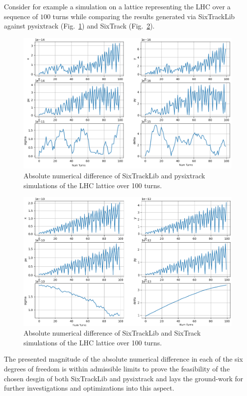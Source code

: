 \documentclass[a4paper,
              ]{jacow}
\begin{document}
Consider for example a simulation on a lattice representing the LHC over a sequence of $100$ turns while comparing the results generated via SixTrackLib against pysixtrack (Fig.~\ref{fig:cmp_sixtracklib_pysixtrack}) and SixTrack (Fig.~\ref{fig:cmp_sixtracklib_sixtrack}). 
\begin{figure}[htb]
 \centering
 \includegraphics[width=\columnwidth]{cmp_sixtracklib_pysixtrack.png}
 \caption{Absolute numerical difference of SixTrackLib and pysixtrack simulations of the LHC lattice over 100 turns.}
 \label{fig:cmp_sixtracklib_pysixtrack}
\end{figure}
\begin{figure}[htb]
 \centering
 \includegraphics[width=\columnwidth]{cmp_sixtracklib_sixtrack.png}
 \caption{Absolute numerical difference of SixTrackLib and SixTrack simulations of the LHC lattice over 100 turns.}
 \label{fig:cmp_sixtracklib_sixtrack}
\end{figure}
The presented magnitude of the absolute numerical difference in each of the six degrees of freedom is within admissible limits to prove the feasibility of the chosen desgin of both SixTrackLib and pysixtrack and lays the ground-work for further investigations and optimizations into this aspect. 
\end{document}
